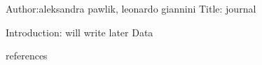Author:aleksandra pawlik, leonardo giannini
Title: journal

Introduction: will write later
Data

references 
